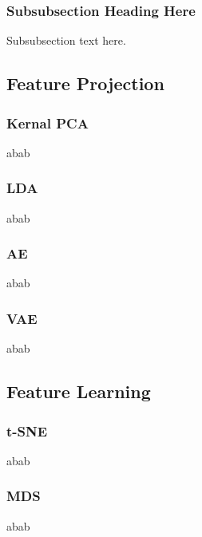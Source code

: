 \documentclass[journal]{IEEEtran}
\begin{document}
\subsubsection{Subsubsection Heading Here}
Subsubsection text here.

\subsection{Feature Projection}
\subsubsection{Kernal PCA}
abab
\subsubsection{LDA}
abab
\subsubsection{AE}
abab
\subsubsection{VAE}
abab

\subsection{Feature Learning}
\subsubsection{t-SNE}
abab
\subsubsection{MDS}
abab

%
%
\end{document}
